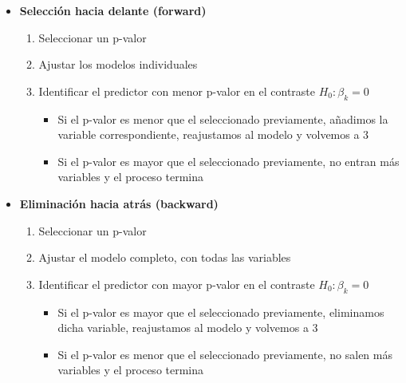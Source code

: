 \begin{itemize}
    \item \textbf{Selección hacia delante (forward)}\begin{enumerate}
        \item Seleccionar un p-valor
        \item Ajustar los modelos individuales
        \item Identificar el predictor con menor p-valor en el contraste $H_0:\beta_k=0$
        \begin{itemize}
            \item Si el p-valor es menor que el seleccionado previamente, añadimos la variable correspondiente, reajustamos al modelo y volvemos a 3
            \item Si el p-valor es mayor que el seleccionado previamente, no entran más variables y el proceso termina
        \end{itemize}
    \end{enumerate}

    \item \textbf{Eliminación hacia atrás (backward)}\begin{enumerate}
        \item Seleccionar un p-valor
        \item Ajustar el modelo completo, con todas las variables
        \item Identificar el predictor con mayor p-valor en el contraste $H_0:\beta_k=0$
        \begin{itemize}
            \item Si el p-valor es mayor que el seleccionado previamente, eliminamos dicha variable, reajustamos al modelo y volvemos a 3
            \item Si el p-valor es menor que el seleccionado previamente, no salen más variables y el proceso termina
        \end{itemize}
    \end{enumerate}


\end{itemize}
